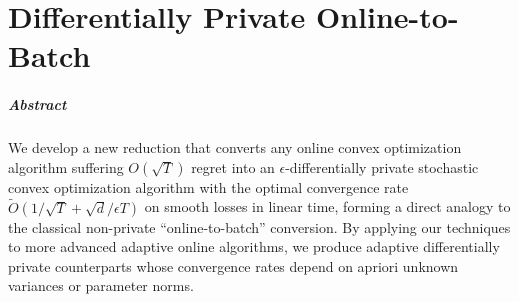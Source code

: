 \chapter{Differentially Private Online-to-Batch}
\label{chapter:dp-otb}
\thispagestyle{myheadings}

\paragraph{Abstract}
  We develop a new reduction that converts any online convex optimization algorithm suffering $O(\sqrt{T})$ regret into an $\epsilon$-differentially private stochastic convex optimization algorithm with the optimal convergence rate $\tilde O(1/\sqrt{T} + \sqrt{d}/\epsilon T)$ on smooth losses in linear time, forming a direct analogy to the classical non-private ``online-to-batch'' conversion. 
By applying our techniques to more advanced adaptive online algorithms, we produce adaptive differentially private counterparts whose convergence rates depend on apriori unknown variances or parameter norms.








